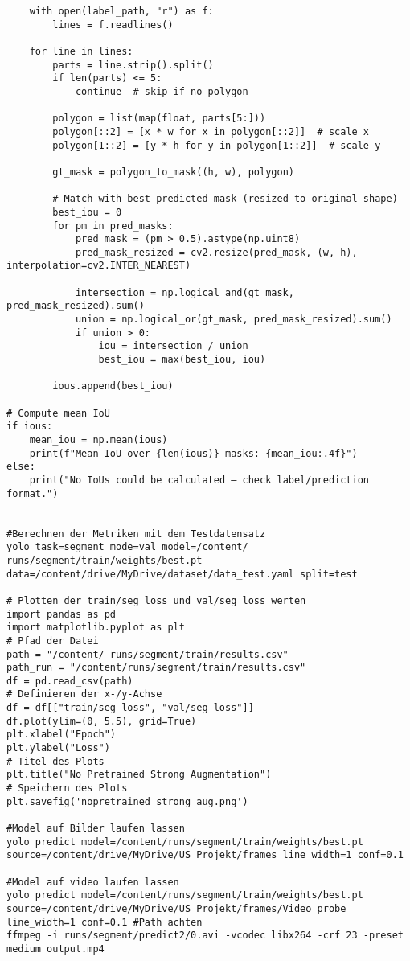 \documentclass[
	german,
	accentcolor=10c,%
	type=intern,
	marginpar=false
	]{tudapub}
\begin{document}
\begin{verbatim}
    with open(label_path, "r") as f:
        lines = f.readlines()

    for line in lines:
        parts = line.strip().split()
        if len(parts) <= 5:
            continue  # skip if no polygon

        polygon = list(map(float, parts[5:]))
        polygon[::2] = [x * w for x in polygon[::2]]  # scale x
        polygon[1::2] = [y * h for y in polygon[1::2]]  # scale y

        gt_mask = polygon_to_mask((h, w), polygon)

        # Match with best predicted mask (resized to original shape)
        best_iou = 0
        for pm in pred_masks:
            pred_mask = (pm > 0.5).astype(np.uint8)
            pred_mask_resized = cv2.resize(pred_mask, (w, h), interpolation=cv2.INTER_NEAREST)

            intersection = np.logical_and(gt_mask, pred_mask_resized).sum()
            union = np.logical_or(gt_mask, pred_mask_resized).sum()
            if union > 0:
                iou = intersection / union
                best_iou = max(best_iou, iou)

        ious.append(best_iou)

# Compute mean IoU
if ious:
    mean_iou = np.mean(ious)
    print(f"Mean IoU over {len(ious)} masks: {mean_iou:.4f}")
else:
    print("No IoUs could be calculated — check label/prediction format.")


#Berechnen der Metriken mit dem Testdatensatz
yolo task=segment mode=val model=/content/ runs/segment/train/weights/best.pt 
data=/content/drive/MyDrive/dataset/data_test.yaml split=test

# Plotten der train/seg_loss und val/seg_loss werten
import pandas as pd
import matplotlib.pyplot as plt
# Pfad der Datei
path = "/content/ runs/segment/train/results.csv"
path_run = "/content/runs/segment/train/results.csv"
df = pd.read_csv(path)
# Definieren der x-/y-Achse
df = df[["train/seg_loss", "val/seg_loss"]]
df.plot(ylim=(0, 5.5), grid=True)
plt.xlabel("Epoch")
plt.ylabel("Loss")
# Titel des Plots
plt.title("No Pretrained Strong Augmentation")
# Speichern des Plots
plt.savefig('nopretrained_strong_aug.png')

#Model auf Bilder laufen lassen
yolo predict model=/content/runs/segment/train/weights/best.pt  source=/content/drive/MyDrive/US_Projekt/frames line_width=1 conf=0.1 

#Model auf video laufen lassen
yolo predict model=/content/runs/segment/train/weights/best.pt source=/content/drive/MyDrive/US_Projekt/frames/Video_probe line_width=1 conf=0.1 #Path achten
ffmpeg -i runs/segment/predict2/0.avi -vcodec libx264 -crf 23 -preset medium output.mp4
\end{verbatim}
\newpage
\printbibliography
\end{document}
